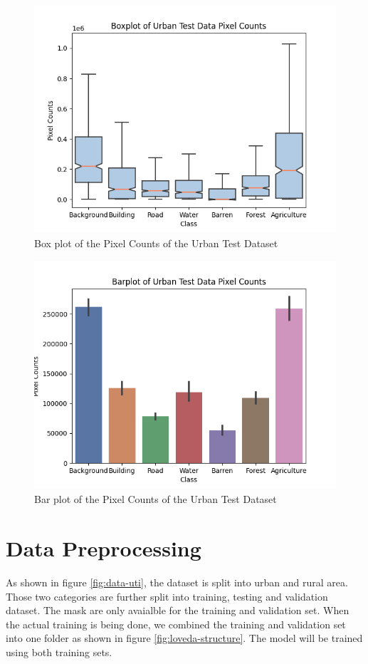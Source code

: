 \begin{figure}[!h]
\includegraphics[width=15.0cm, height=8.5cm]{images/urban test boxplot.png}
\centering
\caption{Box plot of the Pixel Counts of the Urban Test Dataset}
\label{fig:boxplot-urban-test}
\end{figure}

\begin{figure}[!h]
\includegraphics[width=15.0cm, height=8.5cm]{images/urban test barplot.png}
\centering
\caption{Bar plot of the Pixel Counts of the Urban Test Dataset}
\label{fig:barplot-urban-test}
\end{figure}

\FloatBarrier


\section{Data Preprocessing}

As shown in figure \ref{fig:data-uti}, the dataset is split into urban and rural area. Those two categories are further split into training, testing and validation dataset. The mask are only avaialble for the training and validation set. When the actual training is being done, we combined the training and validation set into one folder as shown in figure \ref{fig:loveda-structure}. The model will be trained using both training sets.

